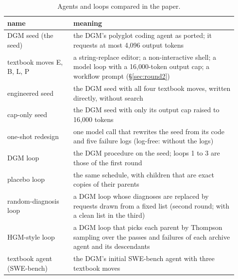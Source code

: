 \begin{table}[t]\centering\footnotesize
\caption{Agents and loops compared in the paper.}\label{tab:arms}
\begin{tabular}{>{\raggedright\arraybackslash}p{0.27\linewidth}>{\raggedright\arraybackslash}p{0.67\linewidth}}\toprule
name & meaning \\ \midrule
DGM seed (the seed) & the DGM's polyglot coding agent as ported; it requests at most 4{,}096 output tokens \\
textbook moves E, B, L, P & a string-replace editor; a non-interactive shell; a model loop with a 16{,}000-token output cap;
a workflow prompt (\S\ref{sec:round2}) \\
engineered seed & the DGM seed with all four textbook moves, written directly, without search \\
cap-only seed & the DGM seed with only its output cap raised to 16{,}000 tokens \\
one-shot redesign & one model call that rewrites the seed from its code and five failure logs (log-free: without the
logs) \\
DGM loop & the DGM procedure on the seed; loops 1 to 3 are those of the first round \\
placebo loop & the same schedule, with children that are exact copies of their parents \\
random-diagnosis loop & a DGM loop whose diagnoses are replaced by requests drawn from a fixed list (second round; with a
clean list in the third) \\
HGM-style loop & a DGM loop that picks each parent by Thompson sampling over the passes and failures of each archive agent
and its descendants \\
textbook agent (SWE-bench) & the DGM's initial SWE-bench agent with three textbook moves \\ \bottomrule
\end{tabular}\end{table}
